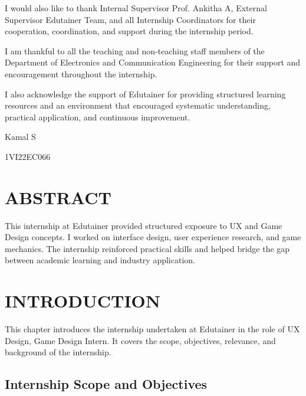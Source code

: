 \documentclass[12pt,a4paper]{report}
\begin{document}
I would also like to thank Internal Supervisor Prof. Ankitha A, External Supervisor Edutainer Team, and all Internship Coordinators for their cooperation, coordination, and support during the internship period.

I am thankful to all the teaching and non-teaching staff members of the Department of Electronics and Communication Engineering for their support and encouragement throughout the internship.

I also acknowledge the support of Edutainer for providing structured learning resources and an environment that encouraged systematic understanding, practical application, and continuous improvement.

\vspace{0.5cm}
Kamal S\par
1VI22EC066\par

\newpage
\chapter*{ABSTRACT}


This internship at Edutainer provided structured exposure to UX and Game Design concepts. I worked on interface design, user experience research, and game mechanics. The internship reinforced practical skills and helped bridge the gap between academic learning and industry application.


\newpage
\tableofcontents
{}

\newpage
\listoffigures
{}

\chapter{INTRODUCTION}


This chapter introduces the internship undertaken at Edutainer in the role of UX Design, Game Design Intern. It covers the scope, objectives, relevance, and background of the internship.


\section{Internship Scope and Objectives}
\end{document}
